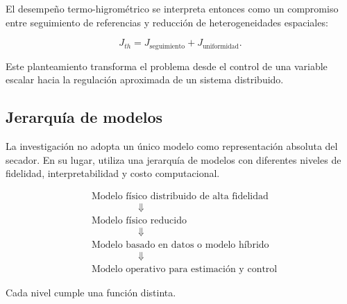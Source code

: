 El desempeño termo-higrométrico se interpreta entonces como un compromiso entre seguimiento de referencias y reducción de heterogeneidades espaciales:

\begin{equation}
\boxed{
J_{th}
=
J_{\text{seguimiento}}
+
J_{\text{uniformidad}}.
}
\label{eq:desempeno_termohigrometrico}
\end{equation}

Este planteamiento transforma el problema desde el control de una variable escalar hacia la regulación aproximada de un sistema distribuido.

\subsection{Jerarquía de modelos}
\label{subsec:jerarquia_modelos}

La investigación no adopta un único modelo como representación absoluta del secador. En su lugar, utiliza una jerarquía de modelos con diferentes niveles de fidelidad, interpretabilidad y costo computacional.

\begin{equation}
\boxed{
\begin{aligned}
&\text{Modelo físico distribuido de alta fidelidad}
\\
&\hspace{2cm}\Downarrow
\\
&\text{Modelo físico reducido}
\\
&\hspace{2cm}\Downarrow
\\
&\text{Modelo basado en datos o modelo híbrido}
\\
&\hspace{2cm}\Downarrow
\\
&\text{Modelo operativo para estimación y control}
\end{aligned}
}
\label{eq:jerarquia_modelos}
\end{equation}

Cada nivel cumple una función distinta.

